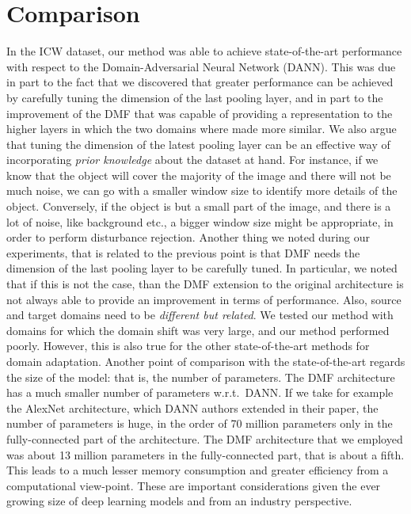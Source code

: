 \documentclass[../main.tex]{subfiles}
\begin{document}
    \chapter{Comparison}
    In the ICW dataset, our method was able to achieve state-of-the-art performance with respect to the
    Domain-Adversarial Neural Network (DANN). This was due in part to the fact that we discovered that greater
    performance can be achieved by carefully tuning the dimension of the last pooling layer, and in part to
    the improvement of the DMF that was capable of providing a representation to the higher layers in which
    the two domains where made more similar. We also argue that tuning the dimension of the latest pooling layer
    can be an effective way of incorporating \textit{prior knowledge} about the dataset at hand. For instance, if
    we know that the object will cover the majority of the image and there will not be much noise, we can go with a
    smaller window size to identify more details of the object. Conversely, if the object is but a small part of the
    image, and there is a lot of noise, like background etc., a bigger window size might be appropriate, in order to
    perform disturbance rejection.
    \newline
    Another thing we noted during our experiments, that is related to the previous point is that DMF needs the dimension
    of the last pooling layer to be carefully tuned. In particular, we noted that if this is not the case, than the DMF
    extension to the original architecture is not always able to provide an improvement in terms of performance. Also,
    source and target domains need to be \textit{different but related}. We tested our method with domains for which the
    domain shift was very large, and our method performed poorly. However, this is also true for the other state-of-the-art
    methods for domain adaptation.
    \newline
    Another point of comparison with the state-of-the-art regards the size of the model: that is, the number of parameters.
    The DMF architecture has a much smaller number of parameters w.r.t.\ DANN\@.
    If we take for example the AlexNet architecture, which DANN authors extended in their paper, the number of parameters is huge,
    in the order of 70 million parameters only in the fully-connected part of the architecture. The DMF architecture that we employed
    was about 13 million parameters in the fully-connected part, that is about a fifth. This leads to a much lesser memory consumption
    and greater efficiency from a computational view-point. These are important considerations given the ever growing size of deep
    learning models and from an industry perspective.
\end{document}
